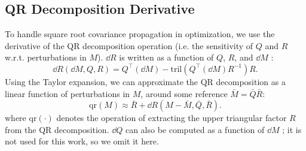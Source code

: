 \subsection{QR Decomposition Derivative}
To handle square root covariance propagation in optimization, we use the derivative of the QR decomposition operation (i.e. the sensitivity of $Q$ and $R$ w.r.t. perturbations in $M$). $\dd R$ is written as a function of \(Q\), \( R\), and  $\dd M$ \cite{deleeuwDifferentiatingQRDecomposition2023}:
\begin{equation}
	\dd R(\dd M, Q, R) = Q^\top (\dd M) - \mathrm{tril}(Q^\top (\dd M) R^{-1}) R.
\end{equation}
Using the Taylor expansion, we can approximate the QR decomposition as a linear function of perturbations in \( M \), around some reference \( \bar{M} = \bar{Q} \bar{R} \):
\begin{equation}
	\mathrm{qr}(M) \approx \bar{R} + \dd R(M - \bar{M}, \bar{Q}, \bar{R}).
\end{equation}
where \( \mathrm{qr}(\cdot) \) denotes the operation of extracting the upper triangular factor \( R \) from the QR decomposition.
\( \dd Q \) can also be computed as a function of \( \dd M\) \cite{deleeuwDifferentiatingQRDecomposition2023}; it is not used for this work, so we omit it here.